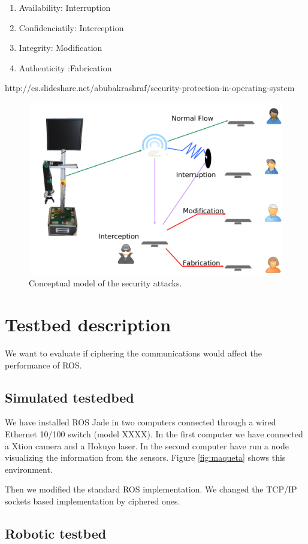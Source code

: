 \documentclass[journal,twoside]{JoPhA}
\begin{document}
\begin{enumerate}
 \item Availability: Interruption
 \item Confidenciatily: Interception
 \item Integrity: Modification
 \item Authenticity :Fabrication
\end{enumerate}


http://es.slideshare.net/abubakrashraf/security-protection-in-operating-system

\begin{figure}[ht]
    \centering
    \includegraphics[width=.5\textwidth]{SecurityAttacks.pdf}
    \caption{Conceptual model of the security attacks.}
  \label{fig:Conceptualmodel}
\end{figure}


\section{Testbed description}

We want to evaluate if ciphering the communications would affect the performance of ROS. 


\subsection{Simulated testedbed}

We have installed ROS Jade in two computers connected through a wired Ethernet 10/100 switch (model XXXX). In the first computer we have connected a Xtion camera and a Hokuyo laser. In the second computer have run a node visualizing the information from the sensors. Figure \ref{fig:maqueta} shows this environment.


Then we modified the standard ROS implementation. We changed the TCP/IP sockets based implementation by ciphered ones.


\subsection{Robotic testbed}
\end{document}

